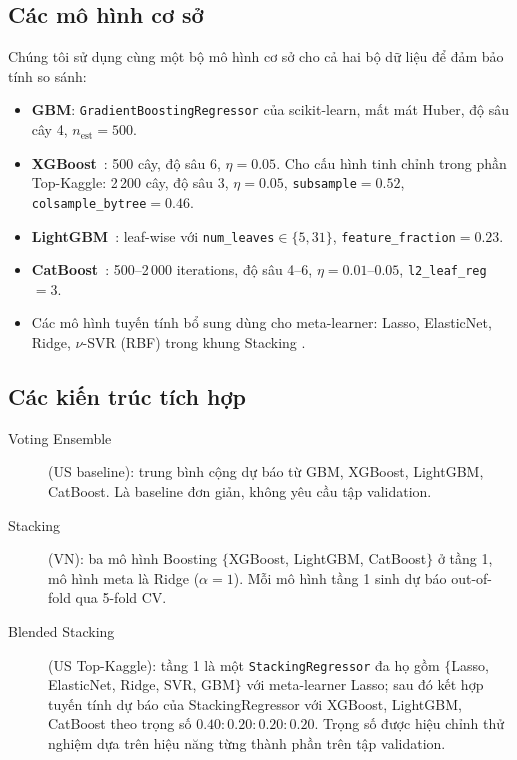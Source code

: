 \documentclass[sigconf,nonacm]{acmart}
\begin{document}
\subsection{Các mô hình cơ sở}

Chúng tôi sử dụng cùng một bộ mô hình cơ sở cho cả hai bộ dữ liệu để
đảm bảo tính so sánh:

\begin{itemize}
\item \textbf{GBM}: \texttt{GradientBoostingRegressor} của
  scikit-learn, mất mát Huber, độ sâu cây 4, $n_\text{est}=500$.
\item \textbf{XGBoost}~\cite{chen2016xgboost}: 500 cây, độ sâu 6,
  $\eta=0.05$. Cho cấu hình tinh chỉnh trong phần Top-Kaggle: 2\,200
  cây, độ sâu 3, $\eta=0.05$, \texttt{subsample}$=0.52$,
  \texttt{colsample\_bytree}$=0.46$.
\item \textbf{LightGBM}~\cite{ke2017lightgbm}: leaf-wise với
  \texttt{num\_leaves}$\in\{5,31\}$, \texttt{feature\_fraction}$=0.23$.
\item \textbf{CatBoost}~\cite{prokhorenkova2018catboost}: 500--2\,000
  iterations, độ sâu 4--6, $\eta=0.01$--$0.05$, \texttt{l2\_leaf\_reg}$=3$.
\item Các mô hình tuyến tính bổ sung dùng cho meta-learner: Lasso,
  ElasticNet, Ridge, $\nu$-SVR (RBF) trong khung Stacking
  \cite{wolpert1992stacked}.
\end{itemize}

\subsection{Các kiến trúc tích hợp}

\begin{description}
\item[Voting Ensemble] (US baseline): trung bình cộng dự báo từ GBM,
  XGBoost, LightGBM, CatBoost. Là baseline đơn giản, không yêu cầu
  tập validation.
\item[Stacking] (VN): ba mô hình Boosting $\{$XGBoost, LightGBM,
  CatBoost$\}$ ở tầng 1, mô hình meta là Ridge ($\alpha=1$). Mỗi mô
  hình tầng 1 sinh dự báo out-of-fold qua 5-fold CV.
\item[Blended Stacking] (US Top-Kaggle): tầng 1 là một
  \texttt{StackingRegressor} đa họ gồm $\{$Lasso, ElasticNet, Ridge,
  SVR, GBM$\}$ với meta-learner Lasso; sau đó kết hợp tuyến tính dự
  báo của StackingRegressor với XGBoost, LightGBM, CatBoost theo
  trọng số $0.40 : 0.20 : 0.20 : 0.20$. Trọng số được hiệu chỉnh thử
  nghiệm dựa trên hiệu năng từng thành phần trên tập validation.
\end{description}
\end{document}
